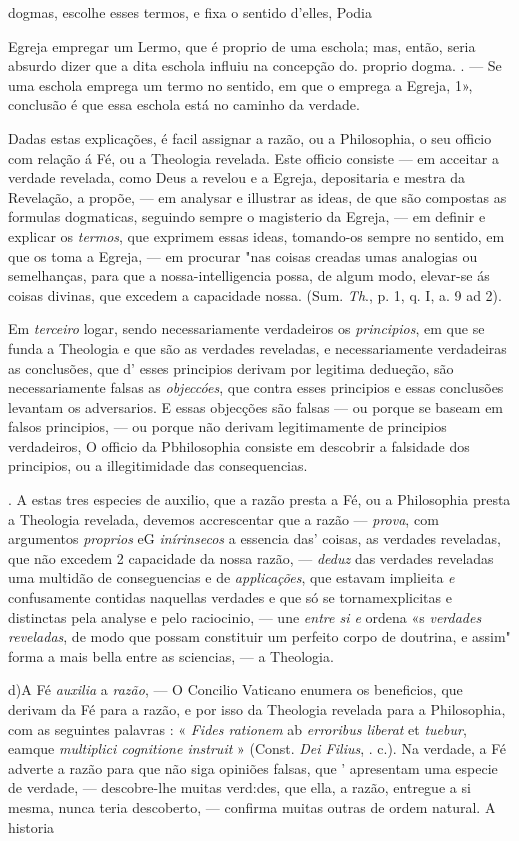 dogmas, escolhe esses termos, e fixa o sentido d'elles, Podia\par Egreja empregar um Lermo, que é proprio de uma eschola; mas, então, seria absurdo dizer que a dita eschola influiu na concepção do. proprio dogma. . --- Se uma eschola emprega um termo no sentido, em que o emprega a Egreja, 1», conclusão é que essa eschola está no caminho da verdade.\par Dadas estas explicações, é facil assignar a razão, ou a Philosophia, o seu officio com relação á Fé, ou a Theologia revelada. Este officio consiste --- em acceitar a verdade revelada, como Deus a revelou e a Egreja, depositaria e mestra da Revelação, a propõe, --- em analysar e illustrar as ideas, de que são compostas as formulas dogmaticas, seguindo sempre o magisterio da Egreja, --- em definir e explicar os \emph{termos}, que exprimem essas ideas, tomando-os sempre no sentido, em que os toma a Egreja, --- em procurar "nas coisas creadas umas analogias ou semelhanças, para que a nossa-intelligencia possa, de algum modo, elevar-se ás coisas divinas, que excedem a capacidade nossa. (Sum. \emph{Th}., p. 1, q. I, a. 9 ad 2).\par Em \emph{terceiro} logar, sendo necessariamente verdadeiros os \emph{principios}, em que se funda a Theologia e que são as verdades reveladas, e necessariamente verdadeiras as conclusões, que d' esses principios derivam por legitima dedueção, são necessariamente falsas as \emph{objeccóes}, que contra esses principios e essas conclusões levantam os adversarios. E essas objecções são falsas --- ou porque se baseam em falsos principios, --- ou porque não derivam legitimamente de principios verdadeiros, O officio da Pbhilosophia consiste em descobrir a falsidade dos principios, ou a illegitimidade das consequencias.\par . A estas tres especies de auxilio, que a razão presta a Fé, ou a Philosophia presta a Theologia revelada, devemos accrescentar que a razão --- \emph{prova}, com argumentos \emph{proprios} eG \emph{inírinsecos} a essencia das' coisas, as verdades reveladas, que não excedem 2 capacidade da nossa razão, --- \emph{deduz} das verdades reveladas uma multidão de conseguencias e de \emph{applicações}, que estavam implieita \emph{e} confusamente contidas naquellas verdades e que só se tornamexplicitas e distinctas pela analyse e pelo raciocinio, --- une \emph{entre si e} ordena «s \emph{verdades reveladas}, de modo que possam constituir um perfeito corpo de doutrina, e assim" forma a mais bella entre as sciencias, --- a Theologia.\par d)A Fé \emph{auxilia} a \emph{razão}, --- O Concilio Vaticano enumera os beneficios, que derivam da Fé para a razão, e por isso da Theologia revelada para a Philosophia, com as seguintes palavras : « \emph{Fides rationem} ab \emph{erroribus liberat} et \emph{tuebur}, eamque \emph{multiplici cognitione instruit} » (Const. \emph{Dei Filius}, \textbar{}. c.). Na verdade, a Fé adverte a razão para que não siga opiniões falsas, que ' apresentam uma especie de verdade, --- descobre-lhe muitas verd:des, que ella, a razão, entregue a si mesma, nunca teria descoberto, --- confirma muitas outras de ordem natural. A historia 